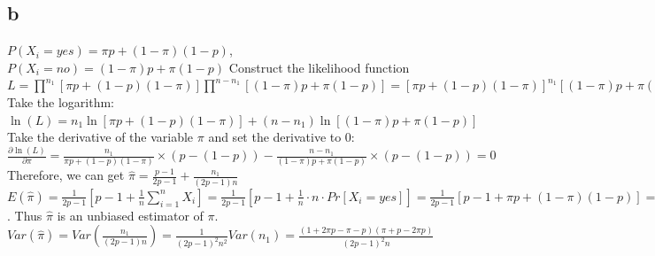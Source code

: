 \documentclass[12pt]{article}
\begin{document}
\subsection{b}
$P(X_i=yes)=\pi p+(1-\pi)(1-p)$, $P(X_i=no)=(1-\pi)p+\pi(1-p)$
\newline
Construct the likelihood function $L=\prod\limits^{n_1}[\pi p+(1-p)(1-\pi)]\prod\limits^{n-n_1}[(1-\pi)p+\pi(1-p)]=[\pi p+(1-p)(1-\pi)]^{n_1}[(1-\pi)p+\pi(1-p)]^{n-n_1}$
\newline
Take the logarithm: $\ln(L)=n_1\ln [\pi p+(1-p)(1-\pi)]+(n-n_1)\ln [(1-\pi)p+\pi(1-p)]$
\newline
Take the derivative of the variable $\pi$ and set the derivative to 0: $\frac{\partial \ln(L)}{\partial \pi}=\frac{n_1}{\pi p+(1-p)(1-\pi)}\times (p-(1-p))-\frac{n-n_1}{(1-\pi)p+\pi(1-p)}\times (p-(1-p))=0$
\newline
Therefore, we can get $\hat{\pi}=\frac{p-1}{2p-1}+\frac{n_1}{(2p-1)n}$
\newline
$E(\hat{\pi})=\frac{1}{2p-1}[p-1+\frac{1}{n}\sum\limits_{i=1}^nX_i]=\frac{1}{2p-1}[p-1+\frac{1}{n} \cdot n\cdot Pr[X_i=yes]]=\frac{1}{2p-1}[p-1+\pi p+(1-\pi)(1-p)]=\pi$. Thus $\hat{\pi}$ is an unbiased estimator of $\pi$.
\newline
$Var(\hat{\pi})=Var(\frac{n_1}{(2p-1)n})=\frac{1}{(2p-1)^2n^2}Var(n_1)=\frac{(1+2\pi p-\pi-p)(\pi+p-2\pi p)}{(2p-1)^2n}$
\end{document}
